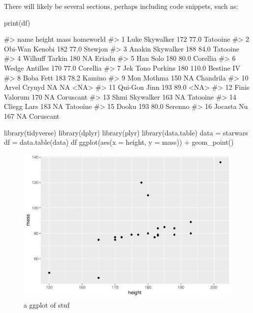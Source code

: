 There will likely be several sections, perhaps including code snippets,
such as:

\begin{Schunk}
\begin{Sinput}
print(df)
\end{Sinput}
\begin{Soutput}
#>                name height  mass  homeworld
#> 1    Luke Skywalker    172  77.0   Tatooine
#> 2    Obi-Wan Kenobi    182  77.0    Stewjon
#> 3  Anakin Skywalker    188  84.0   Tatooine
#> 4    Wilhuff Tarkin    180    NA     Eriadu
#> 5          Han Solo    180  80.0   Corellia
#> 6    Wedge Antilles    170  77.0   Corellia
#> 7  Jek Tono Porkins    180 110.0 Bestine IV
#> 8         Boba Fett    183  78.2     Kamino
#> 9        Mon Mothma    150    NA  Chandrila
#> 10     Arvel Crynyd     NA    NA       <NA>
#> 11     Qui-Gon Jinn    193  89.0       <NA>
#> 12    Finis Valorum    170    NA  Coruscant
#> 13   Shmi Skywalker    163    NA   Tatooine
#> 14      Cliegg Lars    183    NA   Tatooine
#> 15            Dooku    193  80.0    Serenno
#> 16       Jocasta Nu    167    NA  Coruscant
\end{Soutput}
\end{Schunk}

\begin{Schunk}
\begin{Sinput}
library(tidyverse)
library(dplyr)
library(plyr)
library(data.table)
data = starwars %
df = data.table(data)
df %
  ggplot(aes(x = height, 
             y = mass)) +
  geom_point()
\end{Sinput}
\begin{figure}
\includegraphics{my_rmd_document_advanced_files/figure-latex/print-the-plot-1} \caption[a ggplot of stuf]{a ggplot of stuf}\label{fig:print-the-plot}
\end{figure}
\end{Schunk}

